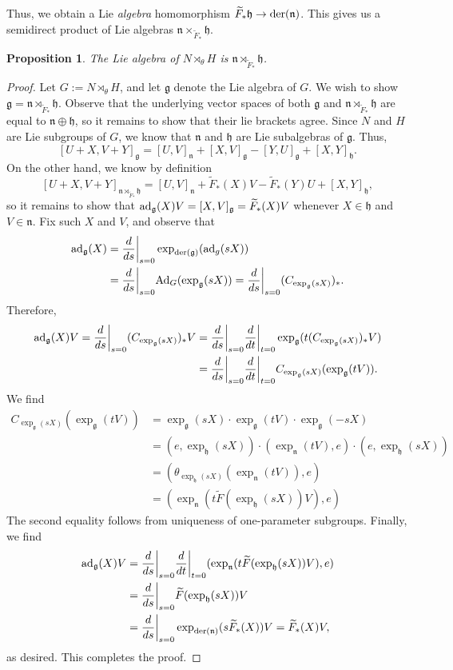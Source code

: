 \documentclass{amsart}
\newcommand{\der}{\text{\normalfont der}}
\newcommand{\Ad}{\text{\normalfont Ad}}
\newcommand{\ad}{\text{\normalfont ad}}
\newcommand{\n}{\mathfrak n}
\newcommand{\h}{\mathfrak h}
\newcommand{\g}{\mathfrak g}
\theoremstyle{plain}
\newtheorem{proposition}[theorem]{Proposition}
\theoremstyle{definition}
\theoremstyle{remark}
\begin{document}
	Thus, we obtain a Lie \emph{algebra} homomorphism $\widetilde F_* \h \rightarrow \der(\n)$. This gives us a semidirect product of Lie algebras $\n\times_{\widetilde F_*} \h$. 
	
	\begin{proposition}
		The Lie algebra of $N \rtimes_\theta H$ is $\n \rtimes_{\widetilde F_*} \h$.
	\end{proposition}
	\begin{proof}
		Let $G := N \rtimes_\theta H$, and let $\g$ denote the Lie algebra of $G$. We wish to show $\g = \n \rtimes_{\widetilde F_*} \h$. Observe that the underlying vector spaces of both $\g$ and $\n \rtimes_{\widetilde F_*} \h$ are equal to $\n \oplus \h$, so it remains to show that their lie brackets agree. Since $N$ and $H$ are Lie subgroups of $G$, we know that $\n$ and $\h$ are Lie subalgebras of $\g$. Thus, 
		$$[U+X,V+Y]_\g = [U,V]_\n + [X,V]_\g - [Y,U]_\g + [X,Y]_\h.$$
		On the other hand, we know by definition
		$$[U+X,V+Y]_{\n \rtimes_{\widetilde F_*} \h} = [U,V]_\n + \widetilde F_*(X)V - \widetilde F_* (Y) U + [X,Y]_\h,$$
		so it remains to show that $\ad_\g(X)V = [X,V]_\g = \widetilde F_*(X)V$ whenever $X \in \h$ and $V \in \n$. Fix such $X$ and $V$, and  observe that 
		\begin{align*}
			\ad_\g(X) &=  \frac{d}{ds}\bigg|_{s=0} \exp_{\der(\g)}( \ad_g (sX))\\
			 &= 
			 \frac{d}{ds}\bigg|_{s=0}  \Ad_G(\exp_\g(sX)) = \frac{d}{ds}\bigg|_{s=0} (C_{\exp_\g(sX)})_*.
		\end{align*}
		Therefore, 
		\begin{align*}
			\ad_\g(X)V = \frac{d}{ds}\bigg|_{s=0}  (C_{\exp_\g(sX)})_*V 
			&= \frac{d}{ds}\bigg|_{s=0} \frac{d}{dt}\bigg|_{t=0} \exp_\g(t(C_{\exp_\g(sX)})_*V)\\
			&=   \frac{d}{ds}\bigg|_{s=0} \frac{d}{dt}\bigg|_{t=0}C_{\exp_\g(sX)}(\exp_\g(tV)).
		\end{align*}
		We find 
		\begin{align*}
			C_{\exp_\g(sX)}(\exp_\g(tV))& = \exp_\g(sX) \cdot \exp_\g(tV) \cdot \exp_\g(-sX) \\
			&= (e, \exp_\h(sX)) \cdot (\exp_\n(tV),e) \cdot (e,\exp_\h(sX)) \\
			&= (\theta_{\exp_\h(sX)}(\exp_\n(tV)),e) \\
			&= (\exp_\n ( t \widetilde F(\exp_\h(sX))V),e)
		\end{align*}
		The second equality follows from uniqueness of one-parameter subgroups. Finally, we find 
		\begin{align*}
			\ad_\g(X)V &= \frac{d}{ds}\bigg|_{s=0} \frac{d}{dt}\bigg|_{t=0} (\exp_\n ( t \widetilde F(\exp_\h(sX))V),e) \\
			&=  \frac{d}{ds} \bigg|_{s=0} \widetilde F(\exp_\h(sX))V \\
			&= \frac{d}{ds} \bigg|_{s=0} \exp_{\der(\n)}(s \widetilde F_*(X))V = \widetilde F_*(X)V,
		\end{align*}
		as desired. This completes the proof.
	\end{proof}
\end{document}
